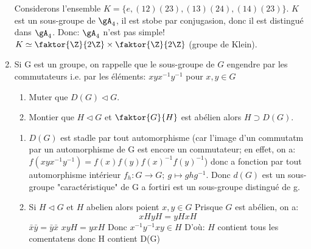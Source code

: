 \begin{enumerate}
\begin{enumerate}
	\end{enumerate}
	\begin{remark}
		Considerons l'ensemble $K=\{e, (12)(23), (13)(24), (14)(23)\}$. $K$ est un sous-groupe de $\gA_4$, il est stobe par conjugasion, donc il est distingué dans $\gA_4$. Donc: $\gA_4$ n'est pas simple! $K\simeq \faktor{\Z}{2\Z}\times\faktor{\Z}{2\Z}$ (groupe de Klein).
	\end{remark}
	\item Si G est un groupe, on rappelle que le sous-groupe de $G$ engendre par les commutateurs i.e. par les éléments: $xyx^{-1}y^{-1}$ pour $x,y\in G$
	\begin{enumerate}
		\item Muter que $D(G)\vartriangleleft G$.
		\item Montier que $H\vartriangleleft G$ et $\faktor{G}{H}$ est abélien alors $H\supset D(G)$.
	\end{enumerate}
	\begin{enumerate}
		\item $D(G)$ est stadle par tout automorphisme (car l'image d'un commutatm par un automorphisme de G est encore un commutateur; en effet, on a:
		$f(xyx^{-1}y^{-1})=f(x)f(y)f(x)^{-1}f(y)^{-1}$)
		donc a fonction par tout automorphisme intérieur $f_h:G\rightarrow G;\ g\mapsto ghg^{-1}$. Donc $d(G)$ est un sous-groupe "caractéristique" de G a fortiri est un sous-groupe distingué de g.
		\item Si $H\vartriangleleft G$ et $H$ abelien alors poient $x,y\in G$ Prisque $G$ est abélien, on a:
		$$xH yH=yH xH$$
		$\bar x \bar y=\bar y\bar x$
		$xyH=yxH$
		Donc $x^{-1}y^{-1}xy\in H$ D'où: $H$ contient tous les comentatens donc H contient D(G)
	\end{enumerate}
\end{enumerate}
